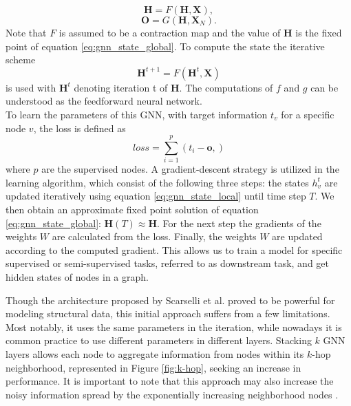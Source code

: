 \begin{equation}
    \mathbf{H} = F(\mathbf{H}, \mathbf{X}),
    \label{eq:gnn_state_global}
\end{equation}
\begin{equation}
    \mathbf{O} = G(\mathbf{H},\mathbf{X}_N).
\end{equation}
Note that $F$ is assumed to be a contraction map and the value of $\mathbf{H}$ is the fixed point of equation \eqref{eq:gnn_state_global}. To compute the state the iterative scheme
\begin{equation}
    \label{eq:GNN_iterations}
    \mathbf{H}^{t+1} = F(\mathbf{H}^t, \mathbf{X})
\end{equation}
is used with $\mathbf{H}^t$ denoting iteration t of $\mathbf{H}$. The computations of $f$ and $g$ can be understood as the feedforward neural network. \\
To learn the parameters of this GNN, with target information $t_v$ for a specific node $v$, the loss is defined as
\begin{equation}
    loss = \sum_{i=1}^p (t_i-\mathbf{o},)
\end{equation}
where $p$ are the supervised nodes. A gradient-descent strategy is utilized in the learning algorithm, which consist of the following three steps: the states $h_v^t$ are updated iteratively using equation \eqref{eq:gnn_state_local} until time step $T$. We then obtain an approximate fixed point solution of equation \eqref{eq:gnn_state_global}: $\mathbf{H}(T)\approx\mathbf{H}$. For the next step the gradients of the weights $W$ are calculated from the loss. Finally, the weights $W$ are updated according to the computed gradient. This allows us to train a model for specific supervised or semi-supervised tasks, referred to as downstream task, and get hidden states of nodes in a graph. \bigskip

Though the architecture proposed by Scarselli et al. \cite{4700287} proved to be powerful for modeling structural data, this initial approach suffers from a few limitations. Most notably, it uses the same parameters in the iteration, while nowadays it is common practice to use different parameters in different layers. Stacking $k$ GNN layers allows each node to aggregate information from nodes within its $k$-hop neighborhood, represented in Figure \ref{fig:k-hop}, seeking an increase in performance. It is important to note that this approach may also increase the noisy information spread by the exponentially increasing neighborhood nodes \cite{Liu2020}.

